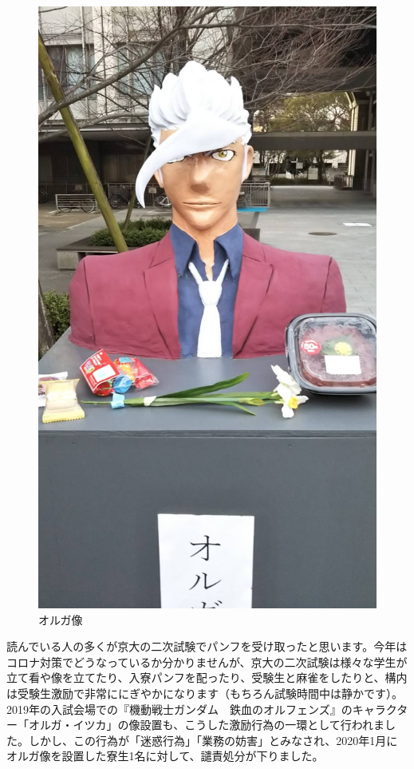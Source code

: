 \begin{figure}
    \includegraphics[width=8zw]{gazo/oruga.jpg}
    \captionsetup{labelformat=empty,labelsep=none}
    \caption{オルガ像}
\end{figure}

読んでいる人の多くが京大の二次試験でパンフを受け取ったと思います。今年はコロナ対策でどうなっているか分かりませんが、京大の二次試験は様々な学生が立て看や像を立てたり、入寮パンフを配ったり、受験生と麻雀をしたりと、構内は受験生激励で非常ににぎやかになります（もちろん試験時間中は静かです）。2019年の入試会場での『機動戦士ガンダム　鉄血のオルフェンズ』のキャラクター「オルガ・イツカ」の像設置も、こうした激励行為の一環として行われました。しかし、この行為が「迷惑行為」「業務の妨害」とみなされ、2020年1月にオルガ像を設置した寮生1名に対して、譴責処分が下りました。

